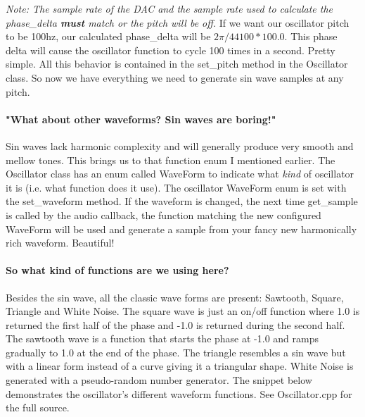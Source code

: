 \documentclass[acmlarge,screen]{acmart}
\begin{document}
	
	\textit{Note: The sample rate of the DAC and the sample rate used to calculate the phase\_delta \textbf{must} match or the pitch will be off.} If we want our oscillator pitch to be 100hz, our calculated phase\_delta will be \( 2\pi/44100 * 100.0\). This phase delta will cause the oscillator function to cycle 100 times in a second. Pretty simple. All this behavior is contained in the set\_pitch method in the Oscillator class. So now we have everything we need to generate sin wave samples at any pitch.
	
	\paragraph{"What about other waveforms? Sin waves are boring!"} Sin waves lack harmonic complexity and will generally produce very smooth and mellow tones. This brings us to that function enum I mentioned earlier. The Oscillator class has an enum called WaveForm to indicate what \textit{kind} of oscillator it is (i.e. what function does it use). The oscillator WaveForm enum is set with the set\_waveform method. If the waveform is changed, the next time get\_sample is called by the audio callback, the function matching the new configured WaveForm will be used and generate a sample from your fancy new harmonically rich waveform. \cite{downey_2016} Beautiful! 
	
	\paragraph{So what kind of functions are we using here?} Besides the sin wave, all the classic wave forms are present: Sawtooth, Square, Triangle and White Noise. The square wave is just an on/off function where 1.0 is returned the first half of the phase and -1.0 is returned during the second half. The sawtooth wave is a function that starts the phase at -1.0 and ramps gradually to 1.0 at the end of the phase. The triangle resembles a sin wave but with a linear form instead of a curve giving it a triangular shape. White Noise is generated with a pseudo-random number generator. \cite{tagi_2019} The snippet below demonstrates the oscillator's different waveform functions. See Oscillator.cpp for the full source.
	
\end{document}
